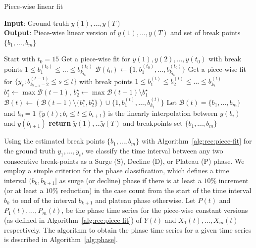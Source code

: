\documentclass[conference,compsoc]{IEEEtran}
\begin{document}
\begin{algorithm}[ht!]
\footnotesize
\caption{Piece-wise linear fit}
\label{alg:algorithm}
\textbf{Input}: Ground truth $y(1), \dots, y(T)$\\
\textbf{Output}:  Piece-wise linear version of $y(1), \dots, y(T)$ and set of break points $\{b_1, \dots, b_{m}\}$ 
\begin{algorithmic}[1] %
\STATE  Start with $t_0=15$ 
\STATE Get a piece-wise fit for $y(1), y(2), \dots, y(t_0)$ with break points $1
\leq b_1^{(t_0)} \leq \dots\leq  b_{k_{t_0}}^{(t_0)}$
\STATE  $\mathcal{B}(t_0) \gets \{1, b_1^{(t_0)}, \dots, b_{k_{t_0}}^{(t_0)} \}$
\STATE Get a piece-wise fit for $\{y_s : b_{k_{t-1}-2}^{(t-1)}\leq s \leq t\}$
with break points $1 \leq b_1^{(t)}\leq b_2^{(t)}\leq  \dots\leq  b_{k_t}^{(t)}$
\STATE $b^\star_{1} \gets \max \mathcal{B}(t-1)$, $b^\star_{2} \gets\max \mathcal{B}(t-1) \setminus b^\star_{1}$
\STATE $\mathcal{B}(t)\gets (\mathcal{B}(t-1) \setminus \{b^\star_{1} , b^\star_{2}\}) \cup \{1,  b_1^{(t)},\dots, b_{k_t}^{(t)} \}$
\ENDWHILE
\STATE Let $\mathcal{B}(t) = \{ b_1, \dots, b_m \}$ and $b_0=1$ 
    \STATE $\{\tilde y(t);  b_i \leq t\leq b_{i+1}\}$ is the  linearly interpolation between  $y(b_i)$ and  $y(b_{i+1})$
    \ENDFOR
\STATE \textbf{return}  $\tilde y(1), \dots \tilde y(T)$ and breakpoints set $\{b_1, \dots, b_m\}$
\end{algorithmic}
\label{alg:rec:piece-fit}
\end{algorithm}

Using the estimated break points $\{b_1, \dots, b_m\}$ with Algorithm~\ref{alg:rec:piece-fit} for the ground truth $y_1, \dots, y_t$, we classify the time interval between any two consecutive break-points as a Surge (S), Decline (D), or Plateau (P) phase. We employ a simple criterion for the phase classification, which defines a time interval $(b_k, b_{k+1}]$ as surge  (or decline) phase if there is at least a $10\%$ increment (or at least a $10\%$ reduction) in the case count from the start of the time interval $b_k$ to end of the interval $b_{k+1}$ and plateau phase otherwise.
Let $P(t)$ and $P_1(t),\dots, P_m(t)$, be the phase time series for the piece-wise constant versions (as defined in Algorithm~\ref{alg:rec:piece-fit}) of $Y(t)$ and $X_1(t), \dots, X_m(t)$ respectively. The algorithm to obtain the phase time series for a given time series is described in Algorithm~\ref{alg:phase}. 
\end{document}
